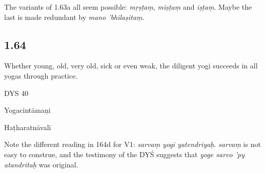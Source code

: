 \begin{ekdosis}
\begin{philcomm}[hp01_063]
The variants of 1.63a all seem possible: \emph{mṛṣṭaṃ}, \emph{miṣṭaṃ} and \emph{iṣṭaṃ}. Maybe the last is made redundant by \emph{mano 'bhilaṣitaṃ}.
\end{philcomm}

\subsection*{1.64}
\begin{translation}[hp01_064]
Whether young, old, very old, sick or even weak, the diligent yogi succeeds in all yogas through practice.
\end{translation}

\begin{sources}[hp01_064]
DYS 40

\begin{versinnote}
\end{versinnote}

\end{sources}

\begin{testimonia}[hp01_064]
Yogacintāmaṇi

\begin{versinnote}
\end{versinnote}

Haṭharatnāvalī

\begin{versinnote}
\end{versinnote}

\end{testimonia}

\begin{philcomm}[hp01_064]
Note the different reading in 164d for V1: \emph{sarvaṃ yogī yatendriyaḥ}. \emph{sarvaṃ} is not easy to construe, and the testimony of the DYŚ suggests that \emph{yoge sarvo ’py atandritaḥ} was original.
\end{philcomm}


\end{ekdosis}

